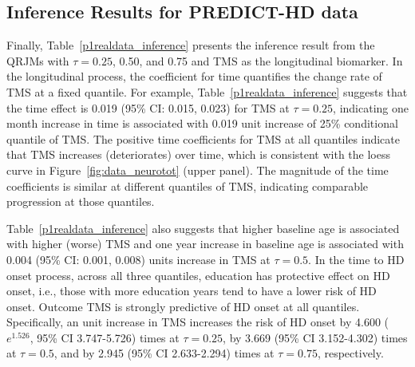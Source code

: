 \documentclass[Crown, sagev, times, doublespace]{sagej}
\begin{document}
\subsection{Inference Results for PREDICT-HD data}\label{sec:data_results}
Finally, Table~\ref{p1realdata_inference} presents the inference result from the QRJMs with $\tau=0.25$, 0.50, and 0.75 and TMS as the longitudinal biomarker. In the longitudinal process, the coefficient for time quantifies the change rate of TMS at a fixed quantile. For example, Table~\ref{p1realdata_inference} suggests that the time effect is 0.019 (95\% CI: 0.015, 0.023) for TMS at $\tau=0.25$, indicating one month increase in time is associated with 0.019 unit increase of 25\% conditional quantile of TMS. The positive time coefficients for TMS at all quantiles indicate that TMS increases (deteriorates) over time, which is consistent with the loess curve in Figure~\ref{fig:data_neurotot} (upper panel). The magnitude of the time coefficients is similar at different quantiles of TMS, indicating comparable progression at those quantiles.

Table~\ref{p1realdata_inference} also suggests that higher baseline age is associated with higher (worse) TMS and one year increase in baseline age is associated with 0.004 (95\% CI: 0.001, 0.008) units increase in TMS at $\tau=0.5$. In the time to HD onset process, across all three quantiles, education has protective effect on HD onset, i.e., those with more education years tend to have a lower risk of HD onset. Outcome TMS is strongly predictive of HD onset at all quantiles. Specifically, an unit increase in TMS increases the risk of HD onset by 4.600 ($e^{1.526}$, 95\% CI 3.747-5.726) times at $\tau=0.25$, by 3.669 (95\% CI 3.152-4.302) times at $\tau=0.5$, and by 2.945 (95\% CI 2.633-2.294) times at $\tau=0.75$, respectively.
\end{document}
